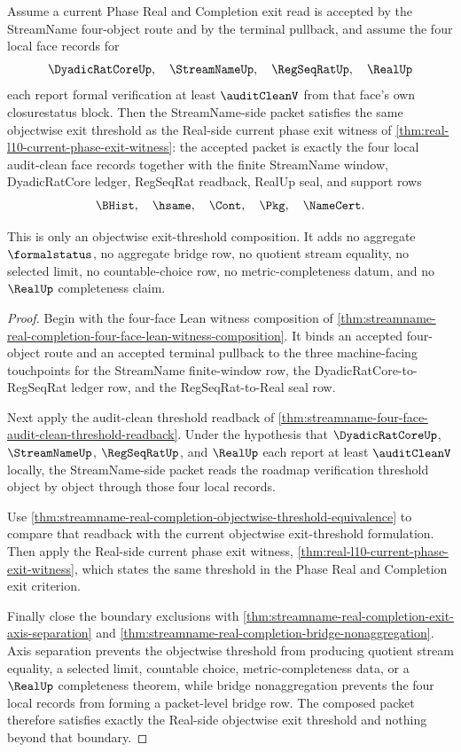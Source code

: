 \begin{theorem}
\label{thm:streamname-real-completion-four-face-audit-clean-composition}
Assume a current Phase Real and Completion exit read is accepted by the StreamName four-object route and by the terminal pullback, and assume the four local face records for
$$
\DyadicRatCoreUp,\quad \StreamNameUp,\quad \RegSeqRatUp,\quad \RealUp
$$
each report formal verification at least $\auditCleanV$ from that face's own closurestatus block. Then the StreamName-side packet satisfies the same objectwise exit threshold as the Real-side current phase exit witness of \autoref{thm:real-l10-current-phase-exit-witness}: the accepted packet is exactly the four local audit-clean face records together with the finite StreamName window, DyadicRatCore ledger, RegSeqRat readback, RealUp seal, and support rows
$$
\BHist,\quad \hsame,\quad \Cont,\quad \Pkg,\quad \NameCert.
$$

This is only an objectwise exit-threshold composition. It adds no aggregate $\formalstatus$, no aggregate bridge row, no quotient stream equality, no selected limit, no countable-choice row, no metric-completeness datum, and no $\RealUp$ completeness claim.
\end{theorem}
\begin{proof}
Begin with the four-face Lean witness composition of \autoref{thm:streamname-real-completion-four-face-lean-witness-composition}. It binds an accepted four-object route and an accepted terminal pullback to the three machine-facing touchpoints for the StreamName finite-window row, the DyadicRatCore-to-RegSeqRat ledger row, and the RegSeqRat-to-Real seal row.

Next apply the audit-clean threshold readback of \autoref{thm:streamname-four-face-audit-clean-threshold-readback}. Under the hypothesis that $\DyadicRatCoreUp$, $\StreamNameUp$, $\RegSeqRatUp$, and $\RealUp$ each report at least $\auditCleanV$ locally, the StreamName-side packet reads the roadmap verification threshold object by object through those four local records.

Use \autoref{thm:streamname-real-completion-objectwise-threshold-equivalence} to compare that readback with the current objectwise exit-threshold formulation. Then apply the Real-side current phase exit witness, \autoref{thm:real-l10-current-phase-exit-witness}, which states the same threshold in the Phase Real and Completion exit criterion.

Finally close the boundary exclusions with \autoref{thm:streamname-real-completion-exit-axis-separation} and \autoref{thm:streamname-real-completion-bridge-nonaggregation}. Axis separation prevents the objectwise threshold from producing quotient stream equality, a selected limit, countable choice, metric-completeness data, or a $\RealUp$ completeness theorem, while bridge nonaggregation prevents the four local records from forming a packet-level bridge row. The composed packet therefore satisfies exactly the Real-side objectwise exit threshold and nothing beyond that boundary.
\end{proof}

